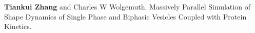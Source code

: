 
\begin{cventries}

  \cventry
    {} %
    {} %
    {} %
    {} %
    {
      \begin{cvitems} %
      	\item {\textbf{Tiankui Zhang} and Charles W Wolgemuth. Massively Parallel Simulation of Shape Dynamics of Single Phase and Biphasic Vesicles Coupled with Protein Kinetics.}
      \end{cvitems}
    }
\end{cventries}